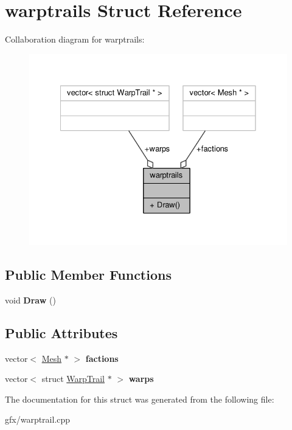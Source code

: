 \hypertarget{structwarptrails}{}\section{warptrails Struct Reference}
\label{structwarptrails}


Collaboration diagram for warptrails\+:
\nopagebreak
\begin{figure}[H]
\begin{center}
\leavevmode
\includegraphics[width=328pt]{db/d35/structwarptrails__coll__graph}
\end{center}
\end{figure}
\subsection*{Public Member Functions}
\begin{DoxyCompactItemize}
\item 
void {\bfseries Draw} ()\hypertarget{structwarptrails_a1e669a07fe64fdfc5c81c54af1c42565}{}\label{structwarptrails_a1e669a07fe64fdfc5c81c54af1c42565}

\end{DoxyCompactItemize}
\subsection*{Public Attributes}
\begin{DoxyCompactItemize}
\item 
vector$<$ \hyperlink{classMesh}{Mesh} $\ast$ $>$ {\bfseries factions}\hypertarget{structwarptrails_aab6c17c9814d3b5eff7709d9e157f480}{}\label{structwarptrails_aab6c17c9814d3b5eff7709d9e157f480}

\item 
vector$<$ struct \hyperlink{structWarpTrail}{Warp\+Trail} $\ast$ $>$ {\bfseries warps}\hypertarget{structwarptrails_acaf209badac5015924b809785b188aaa}{}\label{structwarptrails_acaf209badac5015924b809785b188aaa}

\end{DoxyCompactItemize}


The documentation for this struct was generated from the following file\+:\begin{DoxyCompactItemize}
\item 
gfx/warptrail.\+cpp\end{DoxyCompactItemize}

